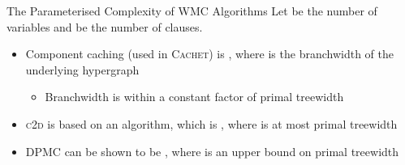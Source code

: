 \documentclass{beamer}
\begin{document}

\begin{frame}{The Parameterised Complexity of WMC Algorithms}
  Let  be the number of \alert{variables} and  be
  the number of \alert{clauses}.
  \begin{itemize}
    \item Component caching (used in \textsc{Cachet}) is
          , where
           is the \alert{branchwidth} of the underlying
          hypergraph
          \textcolor{gray}{\parencite{DBLP:journals/jair/BacchusDP09}}
          \begin{itemize}
            \item Branchwidth is within a constant factor of primal treewidth
          \end{itemize}
    \item \textsc{c2d} is based on an algorithm, which is
          , where  is at most
          \alert{primal treewidth}
          \textcolor{gray}{\parencite{DBLP:journals/jacm/Darwiche01,DBLP:conf/ecai/Darwiche04}}
    \item \textsc{DPMC} can be shown to be ,
          where  is an upper bound on \alert{primal treewidth}
  \end{itemize}
\end{frame}
\end{document}
